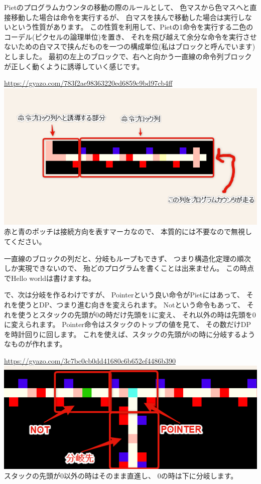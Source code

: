 Pietのプログラムカウンタの移動の際のルールとして、
色マスから色マスへと直接移動した場合は命令を実行するが、
白マスを挟んで移動した場合は実行しないという性質があります。
この性質を利用して、Pietの1命令を実行する二色のコーデル(ピクセルの論理単位)を置き、
それを飛び越えて余分な命令を実行させないための白マスで挟んだものを一つの構成単位(私はブロックと呼んでいます)としました。
最初の左上のブロックで、右へと向かう一直線の命令列ブロックが正しく動くように誘導していく感じです。

\url{https://gyazo.com/783f2ae98363220ed6859c9bd97cb4ff}\\
\href{https://gyazo.com/783f2ae98363220ed6859c9bd97cb4ff}{\includegraphics[width=\textwidth]{images/783f2ae98363220ed6859c9bd97cb4ff.png}} \\
赤と青のポッチは接続方向を表すマーカなので、
本質的には不要なので無視してください。

一直線のブロックの列だと、分岐もループもできず、
つまり構造化定理の順次しか実現できないので、
殆どのプログラムを書くことは出来ません。 この時点でHello
worldは書けますね。

で、次は分岐を作るわけですが、 Pointerという良い命令がPietにはあって、
それを使うとDP、つまり進む向きを変えられます。 Notという命令もあって、
それを使うとスタックの先頭が0の時だけ先頭を1に変え、
それ以外の時は先頭を0に変えられます。
Pointer命令はスタックのトップの値を見て、
その数だけDPを時計回りに回します。
これを使えば、スタックの先頭が0の時に分岐するようなものが作れます。

\url{https://gyazo.com/3c7bc0cb0dd41680c6b652ef4486b390}\\
\href{https://gyazo.com/3c7bc0cb0dd41680c6b652ef4486b390}{\includegraphics[width=\textwidth]{images/3c7bc0cb0dd41680c6b652ef4486b390.png}} \\
スタックの先頭が0以外の時はそのまま直進し、
0の時は下に分岐します。

